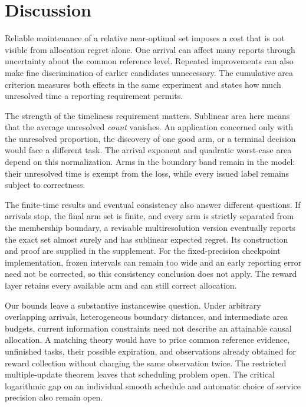 \documentclass[11pt]{article}
\begin{document}
\section{Discussion}
\label{sec:discussion}

Reliable maintenance of a relative near-optimal set imposes a cost that is
not visible from allocation regret alone. One arrival can affect many reports
through uncertainty about the common reference level. Repeated improvements
can also make fine discrimination of earlier candidates unnecessary. The
cumulative area criterion measures both effects in the same experiment
and states how much unresolved time a reporting requirement permits.

The strength of the timeliness requirement matters. Sublinear area here means
that the average unresolved \emph{count} vanishes. An application concerned
only with the unresolved proportion, the discovery of one good arm, or a
terminal decision would face a different task. The arrival exponent and
quadratic worst-case area depend on this normalization. Arms in the boundary
band remain in the model: their unresolved time is exempt from the loss, while
every issued label remains subject to correctness.

The finite-time results and eventual consistency also answer different
questions. If arrivals stop, the final arm set is finite, and every arm is
strictly separated from the membership boundary, a revisable multiresolution
version eventually reports the exact set almost surely and has sublinear
expected regret. Its construction and proof are supplied in the supplement.
For the fixed-precision checkpoint implementation, frozen intervals can remain
too wide and an early reporting error need not be corrected, so this consistency
conclusion does not apply. The reward layer retains every available arm and
can still correct allocation.

Our bounds leave a substantive instancewise question. Under arbitrary
overlapping arrivals, heterogeneous boundary distances, and intermediate area
budgets, current information constraints need not describe an attainable causal
allocation. A matching theory would have to price common reference evidence,
unfinished tasks, their possible expiration, and observations already obtained
for reward collection without charging the same observation twice. The
restricted multiple-update theorem leaves that scheduling problem open.
The critical logarithmic gap on an individual smooth schedule and automatic
choice of service precision also remain open.
\end{document}
